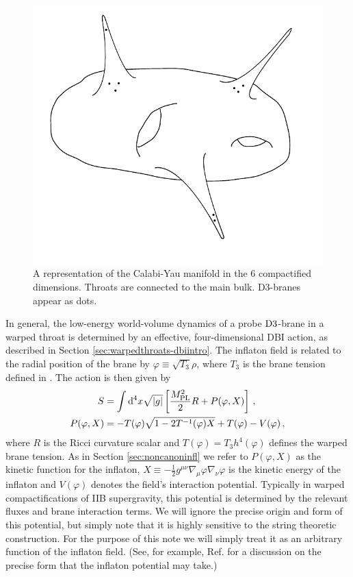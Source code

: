 % 
\begin{figure}
 \centering
 \includegraphics[width=\textwidth]{dbi/graphs/cymanifold}
 \caption[Calabi-Yau Manifold]{A representation of the Calabi-Yau manifold in the 6
compactified
dimensions. Throats are connected to the main bulk. D3-branes appear as dots.}
 \label{fig:braneworld}
\end{figure}
% 

In general, the low-energy world-volume dynamics
of a probe ${\rm D3}$-brane in a warped throat is determined 
by an effective, four-dimensional DBI action, as described in Section
\ref{sec:warpedthroats-dbiintro}.
The inflaton field is related to the radial 
position of the brane by 
$\varphi \equiv \sqrt{T_3} \rho$, where $T_3$ 
is the brane tension defined in . The action is
then given by \cite{brane6}
% 
\begin{align}
\label{eq:DBIaction-dbiintro}
S &=\int  \mathrm{d}^4x \sqrt{|g|} \left[ \frac{M_{\mathrm{PL}}^2}{2} R 
+ P (\varphi , X) \right] \,,\\
\label{eq:Pdefn-dbiintro}
P( \varphi ,X) &= - T (\varphi)  \sqrt{1 - 2T^{-1} (\varphi ) X}
+T (\varphi)  -V(\varphi)  \,,
\end{align}
% 
where $R$ is the Ricci curvature scalar and $T(\varphi ) = T_3 h^4 (\varphi )$
defines the warped brane tension. As in Section \ref{sec:noncanoninfl} we refer
to $P(\varphi , X)$ as the kinetic function for the inflaton, 
$X \equiv - \frac{1}{2} g^{\mu\nu} \nabla_{\mu} \varphi \nabla_{\nu} \varphi$
is the kinetic energy of the inflaton and $V(\varphi )$ denotes 
the field's interaction 
potential. 
Typically in warped compactifications of 
IIB supergravity, this potential is determined by the 
relevant fluxes and brane interaction terms. 
We will ignore the precise origin
and form of this potential, but simply
note that it is highly sensitive to the string theoretic construction. For the
purpose of this note we will simply treat it 
as an arbitrary function of the inflaton field.
(See, for example, Ref. \cite{brane5} for a discussion 
on the precise form that the inflaton potential may take.)


